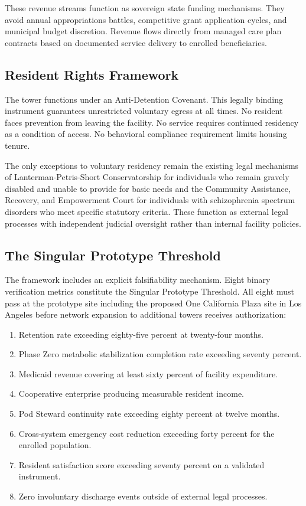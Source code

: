 \documentclass[12pt, letterpaper]{article}
\begin{document}
These revenue streams function as sovereign state funding mechanisms. They avoid annual appropriations battles, competitive grant application cycles, and municipal budget discretion. Revenue flows directly from managed care plan contracts based on documented service delivery to enrolled beneficiaries.

\subsection{Resident Rights Framework}

The tower functions under an Anti-Detention Covenant. This legally binding instrument guarantees unrestricted voluntary egress at all times. No resident faces prevention from leaving the facility. No service requires continued residency as a condition of access. No behavioral compliance requirement limits housing tenure.

The only exceptions to voluntary residency remain the existing legal mechanisms of Lanterman-Petris-Short Conservatorship for individuals who remain gravely disabled and unable to provide for basic needs and the Community Assistance, Recovery, and Empowerment Court for individuals with schizophrenia spectrum disorders who meet specific statutory criteria. These function as external legal processes with independent judicial oversight rather than internal facility policies.

\subsection{The Singular Prototype Threshold}

The framework includes an explicit falsifiability mechanism. Eight binary verification metrics constitute the Singular Prototype Threshold. All eight must pass at the prototype site including the proposed One California Plaza site in Los Angeles before network expansion to additional towers receives authorization:

\begin{enumerate}
    \item Retention rate exceeding eighty-five percent at twenty-four months.
    \item Phase Zero metabolic stabilization completion rate exceeding seventy percent.
    \item Medicaid revenue covering at least sixty percent of facility expenditure.
    \item Cooperative enterprise producing measurable resident income.
    \item Pod Steward continuity rate exceeding eighty percent at twelve months.
    \item Cross-system emergency cost reduction exceeding forty percent for the enrolled population.
    \item Resident satisfaction score exceeding seventy percent on a validated instrument.
    \item Zero involuntary discharge events outside of external legal processes.
\end{enumerate}
\end{document}
